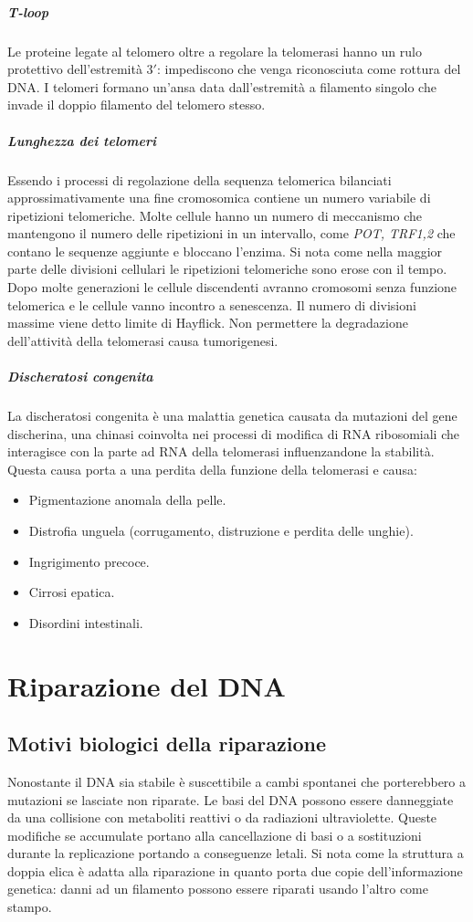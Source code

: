 				\subparagraph{T-loop}
				Le proteine legate al telomero oltre a regolare la telomerasi hanno un rulo protettivo dell'estremit\`a $3'$: impediscono che venga riconosciuta come rottura del DNA.
				I telomeri formano un'ansa data dall'estremit\`a a filamento singolo che invade il doppio filamento del telomero stesso.

				\subparagraph{Lunghezza dei telomeri}
				Essendo i processi di regolazione della sequenza telomerica bilanciati approssimativamente una fine cromosomica contiene un numero variabile di ripetizioni telomeriche.
				Molte cellule hanno un numero di meccanismo che mantengono il numero delle ripetizioni in un intervallo, come \emph{POT, TRF1,2} che contano le sequenze aggiunte e bloccano l'enzima.
				Si nota come nella maggior parte delle divisioni cellulari le ripetizioni telomeriche sono erose con il tempo.
				Dopo molte generazioni le cellule discendenti avranno cromosomi senza funzione telomerica e le cellule vanno incontro a senescenza.
				Il numero di divisioni massime viene detto limite di Hayflick.
				Non permettere la degradazione dell'attivit\`a della telomerasi causa tumorigenesi.

				\subparagraph{Discheratosi congenita}
				La discheratosi congenita \`e una malattia genetica causata da mutazioni del gene discherina, una chinasi coinvolta nei processi di modifica di RNA ribosomiali che interagisce con la parte ad RNA della telomerasi influenzandone la stabilit\`a.
				Questa causa porta a una perdita della funzione della telomerasi e causa:
				\begin{multicols}{2}
					\begin{itemize}
						\item Pigmentazione anomala della pelle.
						\item Distrofia unguela (corrugamento, distruzione e perdita delle unghie).
						\item Ingrigimento precoce.
						\item Cirrosi epatica.
						\item Disordini intestinali.
					\end{itemize}
				\end{multicols}

\section{Riparazione del DNA}

	\subsection{Motivi biologici della riparazione}
	Nonostante il DNA sia stabile \`e suscettibile a cambi spontanei che porterebbero a mutazioni se lasciate non riparate.
	Le basi del DNA possono essere danneggiate da una collisione con metaboliti reattivi o da radiazioni ultraviolette.
	Queste modifiche se accumulate portano alla cancellazione di basi o a sostituzioni durante la replicazione portando a conseguenze letali.
	Si nota come la struttura a doppia elica \`e adatta alla riparazione in quanto porta due copie dell'informazione genetica: danni ad un filamento possono essere riparati usando l'altro come stampo.

